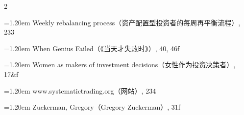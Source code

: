 {\begin{multicols}{2}
\par \noindent\hangindent=1.20em\hspace*{0.00em} Weekly rebalancing process（资产配置型投资者的每周再平衡流程）, 233
\par \noindent\hangindent=1.20em\hspace*{0.00em} When Genius Failed（《当天才失败时》）, 40, 46f
\par \noindent\hangindent=1.20em\hspace*{0.00em} Women as makers of investment decisions（女性作为投资决策者）, 17\&f
\par \noindent\hangindent=1.20em\hspace*{0.00em} www.systematictrading.org（网站）, 234
\par \noindent\hangindent=1.20em\hspace*{0.00em} Zuckerman, Gregory（Gregory Zuckerman）, 31f \end{multicols}

}

